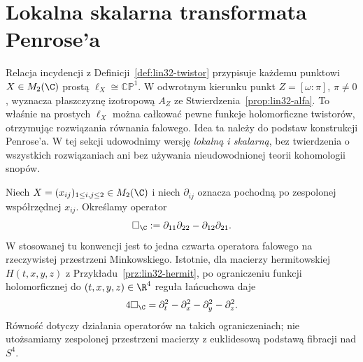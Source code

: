 \section{Lokalna skalarna transformata Penrose'a}
\label{sec:lin32-penrose}

Relacja incydencji z Definicji~\ref{def:lin32-twistor}
przypisuje każdemu punktowi $X\in M_2(\C)$
prostą $\ell_X\cong\mathbb{CP}^1$.
W odwrotnym kierunku punkt $Z=[\omega:\pi]$, $\pi\ne0$,
wyznacza płaszczyznę izotropową $A_Z$ ze
Stwierdzenia~\ref{prop:lin32-alfa}.
To właśnie na prostych $\ell_X$ można całkować
pewne funkcje holomorficzne twistorów,
otrzymując rozwiązania równania falowego.
Idea ta należy do podstaw konstrukcji Penrose'a.
W tej sekcji udowodnimy wersję \emph{lokalną i skalarną},
bez twierdzenia o wszystkich rozwiązaniach ani
bez używania nieudowodnionej teorii kohomologii snopów.

Niech $X=(x_{ij})_{1\le i,j\le2}\in M_2(\C)$
i niech $\partial_{ij}$ oznacza pochodną
po zespolonej współrzędnej $x_{ij}$.
Określamy operator
\begin{equation}\label{eq:lin32-penrose-operator}
 \Box_{\C}:=\partial_{11}\partial_{22}
                 -\partial_{12}\partial_{21}.
\end{equation}
W stosowanej tu konwencji jest to jedna czwarta
operatora falowego na rzeczywistej przestrzeni Minkowskiego.
Istotnie, dla macierzy hermitowskiej
$H(t,x,y,z)$ z Przykładu~\ref{prz:lin32-hermit},
po ograniczeniu funkcji holomorficznej do
$(t,x,y,z)\in\R^4$ reguła łańcuchowa daje
\[
 4\Box_{\C}
 =\partial_t^2-\partial_x^2
  -\partial_y^2-\partial_z^2.
\]
Równość dotyczy działania operatorów na takich
ograniczeniach; nie utożsamiamy zespolonej
przestrzeni macierzy z euklidesową podstawą
fibracji nad $S^4$.

